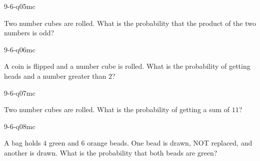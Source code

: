 \begin{practiceQuestion}{9-6-q05}{mc}
\begin{questionText}
Two number cubes are rolled. What is the probability that the product of the two numbers is odd?
\end{questionText}
\end{practiceQuestion}

\begin{practiceQuestion}{9-6-q06}{mc}
\begin{questionText}
A coin is flipped and a number cube is rolled. What is the probability of getting heads and a number greater than $2$?
\end{questionText}
\end{practiceQuestion}

\begin{practiceQuestion}{9-6-q07}{mc}
\begin{questionText}
Two number cubes are rolled. What is the probability of getting a sum of $11$?
\end{questionText}
\end{practiceQuestion}

\begin{practiceQuestion}{9-6-q08}{mc}
\begin{questionText}
A bag holds $4$ green and $6$ orange beads. One bead is drawn, NOT replaced, and another is drawn. What is the probability that both beads are green?
\end{questionText}
\end{practiceQuestion}

